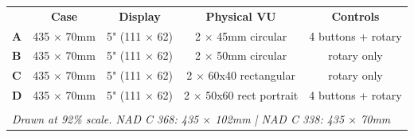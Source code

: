 \documentclass{article}
\begin{document}
\vspace{3mm}

\begin{center}
{\fontsize{7}{9}\selectfont\color{gray}
\begin{tabular}{lcccc}
& \textbf{Case} & \textbf{Display} & \textbf{Physical VU} & \textbf{Controls} \\[2pt]
\textbf{A} & 435 $\times$ 70mm & 5" (111 $\times$ 62) & 2 $\times$ 45mm circular & 4 buttons + rotary \\
\textbf{B} & 435 $\times$ 70mm & 5" (111 $\times$ 62) & 2 $\times$ 50mm circular & rotary only \\
\textbf{C} & 435 $\times$ 70mm & 5" (111 $\times$ 62) & 2 $\times$ 60x40 rectangular & rotary only \\
\textbf{D} & 435 $\times$ 70mm & 5" (111 $\times$ 62) & 2 $\times$ 50x60 rect portrait & 4 buttons + rotary \\[3pt]
\hline \\[-6pt]
\multicolumn{5}{l}{\textit{Drawn at 92\% scale. NAD C 368: 435 $\times$ 102mm | NAD C 338: 435 $\times$ 70mm}}
\end{tabular}}
\end{center}
\end{document}
